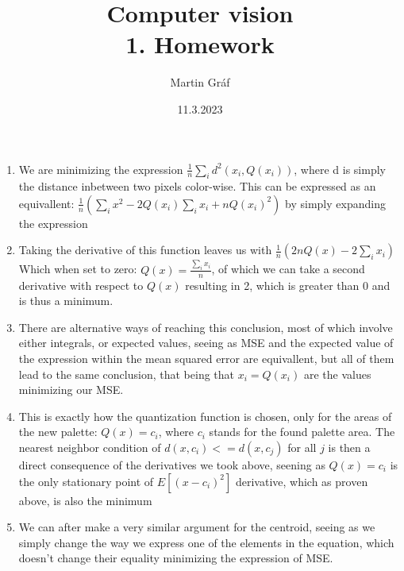 \documentclass[a4paper]{article}
\newenvironment{calculation}[2][Výpočet]{\begin{trivlist} 
\item[\hskip \labelsep {\bfseries #1}\hskip \labelsep {\bfseries #2}]}{\end{trivlist}}
\begin{document}
 
 
\title{ Computer vision \\ 1. Homework} 
\author{Martin Gráf}
\date{11.3.2023}

\maketitle

\begin{calculation}{Task 3}
	
	\begin{enumerate}
		\item We are minimizing the expression $\frac{1}{n} \sum_{i} d^2(x_i, Q(x_i)) $, where d is simply the distance inbetween two pixels color-wise. This can be expressed as an equivallent: $\frac{1}{n} (\sum_{i} x^2 - 2Q(x_i)\sum_{i}x_i+nQ(x_i)^2) $ by simply expanding the expression
		\item Taking the derivative of this function leaves us with $\frac{1}{n} (2nQ(x) - 2\sum_{i} x_i)$ Which when set to zero: $Q(x)=\frac{\sum_{i}x_i}{n}$, of which we can take a second derivative with respect to $Q(x)$ resulting in 2, which is greater than 0 and is thus a minimum.
		\item There are alternative ways of reaching this conclusion, most of which involve either integrals, or expected values, seeing as MSE and the expected value of the expression within the mean squared error are equivallent, but all of them lead to the same conclusion, that being that $x_i = Q(x_i)$ are the values minimizing our MSE.
		\item This is exactly how the quantization function is chosen, only for the areas of the new palette: $Q(x) = c_i$, where $c_i$ stands for the found palette area. The nearest neighbor condition of $d(x, c_i) <= d(x, c_j)$ for all $j$ is then a direct consequence of the derivatives we took above, seening as $Q(x) = c_i$ is the only stationary point of $E[(x - c_i)^2]$ derivative, which as proven above, is also the minimum
		\item We can after make a very similar argument for the centroid, seeing as we simply change the way we express one of the elements in the equation, which doesn't change their equality minimizing the expression of MSE.
    	\end{enumerate}

\end{calculation}
\end{document}
